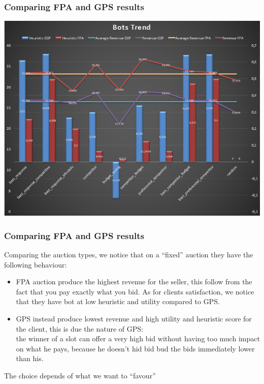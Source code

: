 \documentclass{beamer}
\begin{document}
\begin{frame}
\frametitle{Comparing FPA and GPS results}
\begin{center}
\includegraphics[scale=0.46]{img/Auctions/Combined_Heuristic.PNG} 
\end{center}
\end{frame}


\begin{frame}
\frametitle{Comparing FPA and GPS results}
Comparing the auction types, we notice that on a ``fixed'' auction they have the following behaviour:
\begin{itemize}
\item FPA auction produce the \alert{highest} revenue for the seller, this follow from the fact that you pay exactly what you bid. As for clients satisfaction, we notice that they have bot at \alert{low} heuristic and  utility compared to GPS.
\item GPS instead produce \alert{lowest} revenue and \alert{high} utility and heuristic score for the client, this is due the nature of GPS:\\
the winner of a slot can offer a very high bid without having too much impact on what he pays, because he doesn't hid bid bud the bids immediately lower than his.
\end{itemize}
The choice depends of what we want  to ``favour''
\end{frame}
\end{document}

